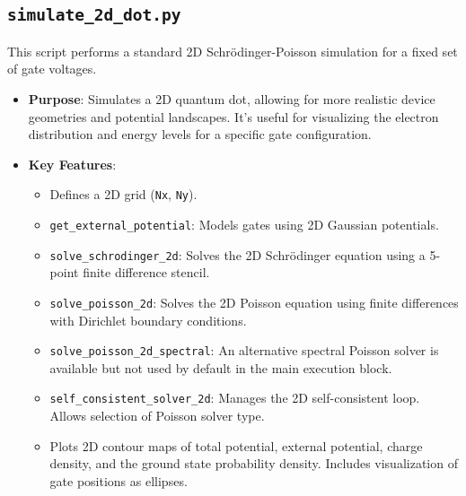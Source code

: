 \documentclass{article}
\begin{document}
\subsection{\texttt{simulate\_2d\_dot.py}}
This script performs a standard 2D Schrödinger-Poisson simulation for a fixed set of gate voltages.
\begin{itemize}
	\item \textbf{Purpose}: Simulates a 2D quantum dot, allowing for more realistic device geometries and potential landscapes. It's useful for visualizing the electron distribution and energy levels for a specific gate configuration.
	\item \textbf{Key Features}:
	      \begin{itemize}
		      \item Defines a 2D grid (\texttt{Nx}, \texttt{Ny}).
		      \item \texttt{get\_external\_potential}: Models gates using 2D Gaussian potentials.
		      \item \texttt{solve\_schrodinger\_2d}: Solves the 2D Schrödinger equation using a 5-point finite difference stencil.
		      \item \texttt{solve\_poisson\_2d}: Solves the 2D Poisson equation using finite differences with Dirichlet boundary conditions.
		      \item \texttt{solve\_poisson\_2d\_spectral}: An alternative spectral Poisson solver is available but not used by default in the main execution block.
		      \item \texttt{self\_consistent\_solver\_2d}: Manages the 2D self-consistent loop. Allows selection of Poisson solver type.
		      \item Plots 2D contour maps of total potential, external potential, charge density, and the ground state probability density. Includes visualization of gate positions as ellipses.
	      \end{itemize}
\end{itemize}
\end{document}
